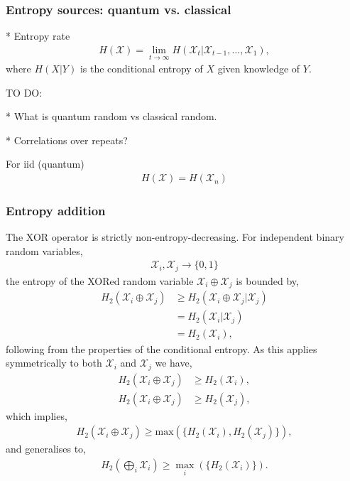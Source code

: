 \subsubsection{Entropy sources: quantum vs. classical}

* Entropy rate
\begin{align}
	H(\mathcal{X}) = \lim_{t\to\infty} H(\mathcal{X}_t | \mathcal{X}_{t-1},\dots,\mathcal{X}_1),
\end{align}
where $H(X|Y)$ is the conditional entropy of $X$ given knowledge of $Y$.

TO DO:

* What is quantum random vs classical random.

* Correlations over repeats?

For iid (quantum)
\begin{align}
	H(\mathcal{X}) = H(\mathcal{X}_n)
\end{align}

\subsubsection{Entropy addition} \label{sec:entropy_add}

The XOR operator is strictly non-entropy-decreasing. For independent binary random variables,
\begin{align}
	\mathcal{X}_i, \mathcal{X}_j \to \{0,1\}
\end{align}
the entropy of the XORed random variable \mbox{$\mathcal{X}_i\oplus\mathcal{X}_j$} is bounded by,
\begin{align}
	H_2(\mathcal{X}_i \oplus \mathcal{X}_j) & \geq H_2(\mathcal{X}_i \oplus \mathcal{X}_j|\mathcal{X}_j) \nonumber \\
	                                        & = H_2(\mathcal{X}_i|\mathcal{X}_j) \nonumber                         \\
	                                        & = H_2(\mathcal{X}_i),
\end{align}
following from the properties of the conditional entropy. As this applies symmetrically to both $\mathcal{X}_i$ and $\mathcal{X}_j$ we have,
\begin{align}
	H_2(\mathcal{X}_i \oplus \mathcal{X}_j) & \geq H_2(\mathcal{X}_i), \nonumber \\
	H_2(\mathcal{X}_i \oplus \mathcal{X}_j) & \geq H_2(\mathcal{X}_j),
\end{align}
which implies,
\begin{align}
	H_2(\mathcal{X}_i \oplus \mathcal{X}_j) \geq \mathrm{max}(\{H_2(\mathcal{X}_i),H_2(\mathcal{X}_j)\}),
\end{align}
and generalises to,
\begin{align}
	H_2\left(\bigoplus_i \mathcal{X}_i \right) \geq \max_i(\{H_2(\mathcal{X}_i)\}).
\end{align}

